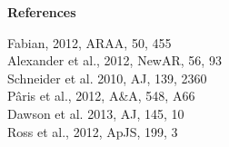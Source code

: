 \documentclass[11pt,epsf]{article}
\begin{document}
\vspace{-16pt}
\begin{center}
 \medskip
 \medskip
 {\large \bf References}
    \vspace{-10pt}
\end{center}
\begin{multicols}{3}[]
\noindent
\scriptsize
{}\rbrack Fabian, 2012, ARAA, 50, 455 \\
\rbrack Alexander et al., 2012, NewAR, 56, 93\\
\rbrack Schneider et al. 2010, AJ, 139, 2360\\
\rbrack P\^{a}ris et al., 2012, A\&A, 548, A66 \\
\rbrack Dawson et al. 2013, AJ, 145, 10\\
\rbrack Ross et al., 2012, ApJS, 199, 3\\

\end{multicols}
\end{document}
